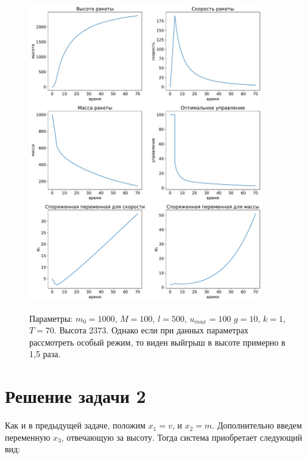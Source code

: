 \documentclass[12pt, a4paper]{article} %
\begin{document}
\begin{figure}[H]
\begin{center}
    \includegraphics[width=0.9\textwidth]{1_5.pdf}
    \label{fig:1_5}
    \caption{Параметры: $m_0=1000$, $M=100$,  $l=500$,  $u_{max}=100$
        $g=10$,  $k=1$,  $T=70$.
        Высота $2373$.
        Однако если при данных параметрах рассмотреть особый режим, то виден выйгрыш в высоте примерно в 1,5 раза.}
\end{center} 
\end{figure}

\section{Решение задачи 2}

Как и в предыдущей задаче, положим $x_1 = v$, и $x_2 = m$. 
Дополнительно введем переменную $x_3$, отвечающую за высоту.
Тогда система приобретает следующий вид:
\end{document}
